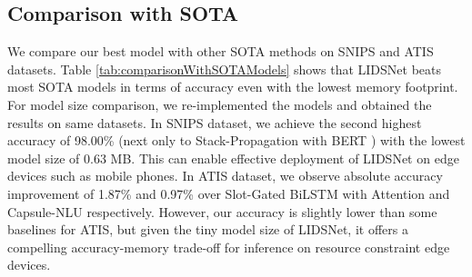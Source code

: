\documentclass[conference]{IEEEtran}
\begin{document}
\subsection{Comparison with SOTA}\label{sec:comparisonWithSOTA}

We compare our best model with other SOTA methods on SNIPS and ATIS datasets. Table \ref{tab:comparisonWithSOTAModels} shows that LIDSNet beats most SOTA models in terms of accuracy even with the lowest memory footprint. For model size comparison, we re-implemented the models and obtained the results on same datasets. In SNIPS dataset, we achieve the second highest accuracy of 98.00\% (next only to Stack-Propagation with BERT \cite{qin2019stackpropagation}) with the lowest model size of 0.63 MB. This can enable effective deployment of LIDSNet on edge devices such as mobile phones. In ATIS dataset, we observe absolute accuracy improvement of 1.87\% and 0.97\% over Slot-Gated BiLSTM with Attention \cite{goo-etal-2018-slot} and Capsule-NLU \cite{zhang2019joint} respectively. However, our accuracy is slightly lower than some baselines for ATIS, but given the tiny model size of LIDSNet, it offers a compelling accuracy-memory trade-off for inference on resource constraint edge devices.
\end{document}
